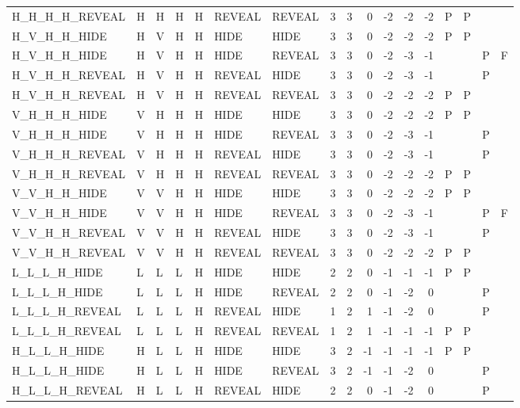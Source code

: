 \begin{longtable}{lllllllrrrrrrllll}
  H\_H\_H\_H\_REVEAL & H & H & H & H & REVEAL & REVEAL & 3 & 3 & 0 & -2 & -2 & -2 & P & P &  &  \\ 
  H\_V\_H\_H\_HIDE & H & V & H & H & HIDE & HIDE & 3 & 3 & 0 & -2 & -2 & -2 & P & P &  &  \\ 
  H\_V\_H\_H\_HIDE & H & V & H & H & HIDE & REVEAL & 3 & 3 & 0 & -2 & -3 & -1 &  &  & P & F \\ 
  H\_V\_H\_H\_REVEAL & H & V & H & H & REVEAL & HIDE & 3 & 3 & 0 & -2 & -3 & -1 &  &  & P &  \\ 
  H\_V\_H\_H\_REVEAL & H & V & H & H & REVEAL & REVEAL & 3 & 3 & 0 & -2 & -2 & -2 & P & P &  &  \\ 
  V\_H\_H\_H\_HIDE & V & H & H & H & HIDE & HIDE & 3 & 3 & 0 & -2 & -2 & -2 & P & P &  &  \\ 
  V\_H\_H\_H\_HIDE & V & H & H & H & HIDE & REVEAL & 3 & 3 & 0 & -2 & -3 & -1 &  &  & P &  \\ 
  V\_H\_H\_H\_REVEAL & V & H & H & H & REVEAL & HIDE & 3 & 3 & 0 & -2 & -3 & -1 &  &  & P &  \\ 
  V\_H\_H\_H\_REVEAL & V & H & H & H & REVEAL & REVEAL & 3 & 3 & 0 & -2 & -2 & -2 & P & P &  &  \\ 
  V\_V\_H\_H\_HIDE & V & V & H & H & HIDE & HIDE & 3 & 3 & 0 & -2 & -2 & -2 & P & P &  &  \\ 
  V\_V\_H\_H\_HIDE & V & V & H & H & HIDE & REVEAL & 3 & 3 & 0 & -2 & -3 & -1 &  &  & P & F \\ 
  V\_V\_H\_H\_REVEAL & V & V & H & H & REVEAL & HIDE & 3 & 3 & 0 & -2 & -3 & -1 &  &  & P &  \\ 
  V\_V\_H\_H\_REVEAL & V & V & H & H & REVEAL & REVEAL & 3 & 3 & 0 & -2 & -2 & -2 & P & P &  &  \\ 
  L\_L\_L\_H\_HIDE & L & L & L & H & HIDE & HIDE & 2 & 2 & 0 & -1 & -1 & -1 & P & P &  &  \\ 
  L\_L\_L\_H\_HIDE & L & L & L & H & HIDE & REVEAL & 2 & 2 & 0 & -1 & -2 & 0 &  &  & P &  \\ 
  L\_L\_L\_H\_REVEAL & L & L & L & H & REVEAL & HIDE & 1 & 2 & 1 & -1 & -2 & 0 &  &  & P &  \\ 
  L\_L\_L\_H\_REVEAL & L & L & L & H & REVEAL & REVEAL & 1 & 2 & 1 & -1 & -1 & -1 & P & P &  &  \\ 
  H\_L\_L\_H\_HIDE & H & L & L & H & HIDE & HIDE & 3 & 2 & -1 & -1 & -1 & -1 & P & P &  &  \\ 
  H\_L\_L\_H\_HIDE & H & L & L & H & HIDE & REVEAL & 3 & 2 & -1 & -1 & -2 & 0 &  &  & P &  \\ 
  H\_L\_L\_H\_REVEAL & H & L & L & H & REVEAL & HIDE & 2 & 2 & 0 & -1 & -2 & 0 &  &  & P &  \\ 

\end{longtable}
